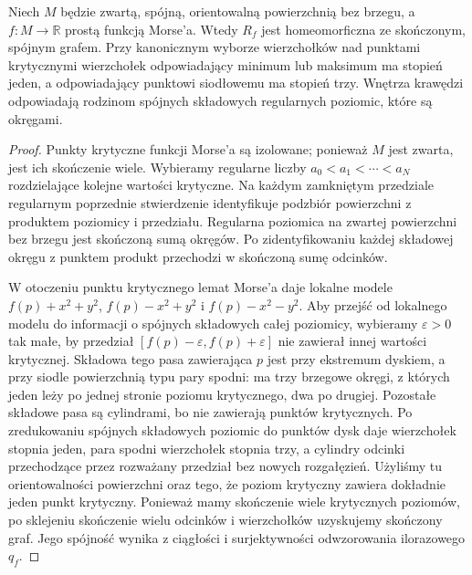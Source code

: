 \begin{twierdzenie}
\label{thm:tg-reeb-finite}
Niech $M$ będzie zwartą, spójną, orientowalną
powierzchnią bez brzegu, a $f:M\to\mathbb R$
prostą funkcją Morse'a. Wtedy $R_f$ jest
homeomorficzna ze skończonym, spójnym grafem.
Przy kanonicznym wyborze wierzchołków nad punktami
krytycznymi wierzchołek odpowiadający minimum lub
maksimum ma stopień jeden, a odpowiadający punktowi
siodłowemu ma stopień trzy. Wnętrza krawędzi
odpowiadają rodzinom spójnych składowych regularnych
poziomic, które są okręgami.
\end{twierdzenie}

\begin{proof}
Punkty krytyczne funkcji Morse'a są izolowane;
ponieważ $M$ jest zwarta, jest ich skończenie wiele.
Wybieramy regularne liczby
$a_0<a_1<\cdots<a_N$ rozdzielające kolejne wartości
krytyczne. Na każdym zamkniętym przedziale regularnym
poprzednie stwierdzenie identyfikuje podzbiór powierzchni
z produktem poziomicy i przedziału. Regularna poziomica
na zwartej powierzchni bez brzegu jest skończoną sumą
okręgów. Po zidentyfikowaniu każdej składowej okręgu
z punktem produkt przechodzi w skończoną sumę odcinków.

W otoczeniu punktu krytycznego lemat Morse'a daje lokalne
modele $f(p)+x^2+y^2$, $f(p)-x^2+y^2$ i
$f(p)-x^2-y^2$. Aby przejść od lokalnego modelu do
informacji o spójnych składowych całej poziomicy,
wybieramy $\varepsilon>0$ tak małe, by przedział
$[f(p)-\varepsilon,f(p)+\varepsilon]$ nie zawierał
innej wartości krytycznej. Składowa tego pasa zawierająca
$p$ jest przy ekstremum dyskiem, a przy siodle
powierzchnią typu pary spodni: ma trzy brzegowe okręgi,
z których jeden leży po jednej stronie poziomu
krytycznego, dwa po drugiej. Pozostałe składowe pasa
są cylindrami, bo nie zawierają punktów krytycznych.
Po zredukowaniu spójnych składowych poziomic do punktów
dysk daje wierzchołek stopnia jeden, para spodni
wierzchołek stopnia trzy, a cylindry odcinki
przechodzące przez rozważany przedział bez nowych
rozgałęzień. Użyliśmy tu orientowalności powierzchni
oraz tego, że poziom krytyczny zawiera dokładnie jeden
punkt krytyczny.
Ponieważ mamy skończenie wiele krytycznych poziomów,
po sklejeniu skończenie wielu odcinków i wierzchołków
uzyskujemy skończony graf. Jego spójność wynika z
ciągłości i surjektywności odwzorowania ilorazowego $q_f$.
\end{proof}

